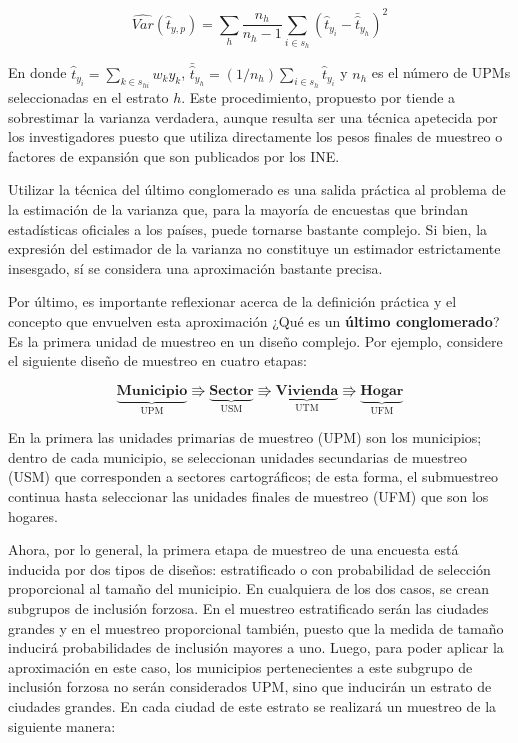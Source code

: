 \documentclass[
  12pt,
  spanish,
]{book}
\begin{document}
\[
\widehat{Var}(\hat{t}_{y,p}) = 
\sum_h\frac{n_h}{n_h-1}\sum_{i\in s_h}\left(\hat{t}_{y_i}-\bar{\hat{t}}_{y_h}\right)^2
\]

En donde \(\hat{t}_{y_i} = \sum_{k \in s_{hi}} w_k y_k\), \(\bar{\hat{t}}_{y_h}=(1/n_h)\sum_{i \in s_h}\hat{t}_{y_i}\) y \(n_h\) es el número de UPMs seleccionadas en el estrato \(h\). Este procedimiento, propuesto por \citet{hansen1953sample} tiende a sobrestimar la varianza verdadera, aunque resulta ser una técnica apetecida por los investigadores puesto que utiliza directamente los pesos finales de muestreo o factores de expansión que son publicados por los INE.

Utilizar la técnica del último conglomerado es una salida práctica al problema de la estimación de la varianza que, para la mayoría de encuestas que brindan estadísticas oficiales a los países, puede tornarse bastante complejo. Si bien, la expresión del estimador de la varianza no constituye un estimador estrictamente insesgado, sí se considera una aproximación bastante precisa.

Por último, es importante reflexionar acerca de la definición práctica y el concepto que envuelven esta aproximación ¿Qué es un \textbf{último conglomerado}? Es la primera unidad de muestreo en un diseño complejo. Por ejemplo, considere el siguiente diseño de muestreo en cuatro etapas:

\begin{equation*}
\underbrace{\textbf{Municipio}}_{\text{UPM}} \Rrightarrow
\underbrace{\textbf{Sector}}_{\text{USM}} \Rrightarrow
\underbrace{\textbf{Vivienda}}_{\text{UTM}} \Rrightarrow
\underbrace{\textbf{Hogar}}_{\text{UFM}}
\end{equation*}

En la primera las unidades primarias de muestreo (UPM) son los municipios; dentro de cada municipio, se seleccionan unidades secundarias de muestreo (USM) que corresponden a sectores cartográficos; de esta forma, el submuestreo continua hasta seleccionar las unidades finales de muestreo (UFM) que son los hogares.

Ahora, por lo general, la primera etapa de muestreo de una encuesta está inducida por dos tipos de diseños: estratificado o con probabilidad de selección proporcional al tamaño del municipio. En cualquiera de los dos casos, se crean subgrupos de inclusión forzosa. En el muestreo estratificado serán las ciudades grandes y en el muestreo proporcional también, puesto que la medida de tamaño inducirá probabilidades de inclusión mayores a uno. Luego, para poder aplicar la aproximación en este caso, los municipios pertenecientes a este subgrupo de inclusión forzosa no serán considerados UPM, sino que inducirán un estrato de ciudades grandes. En cada ciudad de este estrato se realizará un muestreo de la siguiente manera:
\end{document}
